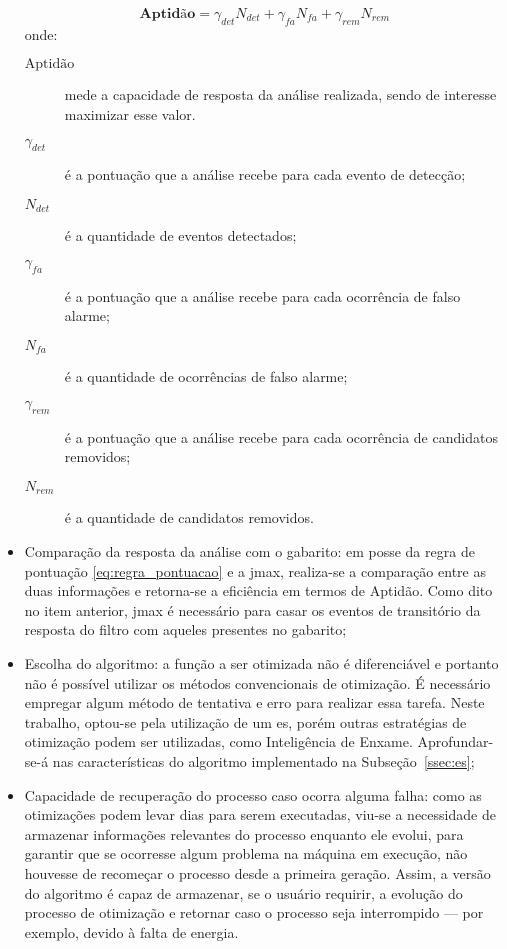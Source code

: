 \begin{itemize}
\begin{equation}\label{eq:regra_pontuacao}
\textbf{Aptidão}=\gamma_{det}N_{det}+\gamma_{fa}N_{fa}+\gamma_{rem}N_{rem}
\end{equation}
\noindent onde:
\begin{description}
\item[$\text{Aptidão}$] mede a capacidade de resposta da análise realizada,
sendo de interesse maximizar esse valor.
\item[$\gamma_{det}$] é a pontuação que a análise recebe para cada
evento de detecção;
\item[$N_{det}$] é a quantidade de eventos detectados;
\item[$\gamma_{fa}$] é a pontuação que a análise recebe para cada
ocorrência de falso alarme;
\item[$N_{fa}$] é a quantidade de ocorrências de falso alarme;
\item[$\gamma_{rem}$] é a pontuação que a análise recebe para cada
ocorrência de candidatos removidos;
\item[$N_{rem}$] é a quantidade de candidatos removidos.
\end{description}

\item Comparação da resposta da análise com o gabarito: em posse da
regra de pontuação \ref{eq:regra_pontuacao} e a \gls{jmax}, realiza-se a
comparação entre as duas informações e retorna-se a eficiência em termos
de Aptidão. Como dito no item anterior, \gls{jmax} é necessário para
casar os eventos de transitório da resposta do filtro com aqueles
presentes no gabarito;

\item Escolha do algoritmo: a função a ser otimizada não é
diferenciável e portanto não é possível utilizar os métodos
convencionais de otimização. É necessário empregar algum método de
tentativa e erro para realizar essa tarefa. Neste trabalho, optou-se
pela utilização de um \acs{es}, porém outras estratégias de
otimização podem ser utilizadas, como Inteligência de Enxame.
Aprofundar-se-á nas características do algoritmo
implementado na Subseção~\ref{ssec:es};

\item Capacidade de recuperação do processo caso ocorra alguma falha:
como as otimizações podem levar dias para serem executadas, viu-se a
necessidade de armazenar informações relevantes do processo enquanto
ele evolui, para garantir que se ocorresse algum problema na máquina
em execução, não houvesse de recomeçar o processo desde a primeira
geração. Assim, a versão do algoritmo é capaz de armazenar, se o
usuário requirir, a evolução do processo de otimização e retornar caso
o processo seja interrompido --- por exemplo, devido à falta de
energia.

\end{itemize}


